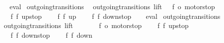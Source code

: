 \begin{isabellebody}
%
\isadelimproof
\ \ %
\endisadelimproof
%
\isatagproof
{}\isamarkupfalse%
\ eval%
\endisatagproof
{\isafoldproof}%
%
\isadelimproof
\isanewline
%
\endisadelimproof
\isanewline
{}\isamarkupfalse%
\ outgoing{\isacharunderscore}transitions{\isacharunderscore}{}{\isacharcolon}\isanewline
\ \ {\isachardoublequoteopen}outgoing{\isacharunderscore}transitions\ lift\ {}\ {\isacharequal}\ {\isacharbraceleft}{\isacharbar}{\isacharparenleft}{\isacharparenleft}f{}{\isacharcomma}\ o{}{\isacharparenright}{\isacharcomma}\ motorstop{}{\isacharparenright}{\isacharcomma}\isanewline
\ \ \ \ {\isacharparenleft}{\isacharparenleft}f{}{\isacharcomma}\ f{}{\isacharparenright}{\isacharcomma}\ up{}{}stop{\isacharparenright}{\isacharcomma}\isanewline
\ \ \ \ {\isacharparenleft}{\isacharparenleft}f{}{\isacharcomma}\ f{}{\isacharparenright}{\isacharcomma}\ up{}{}{\isacharparenright}{\isacharcomma}\isanewline
\ \ \ \ {\isacharparenleft}{\isacharparenleft}f{}{\isacharcomma}\ f{}{\isacharparenright}{\isacharcomma}\ down{}{}stop{\isacharparenright}{\isacharbar}{\isacharbraceright}{\isachardoublequoteclose}\isanewline
%
\isadelimproof
\ \ %
\endisadelimproof
%
\isatagproof
{}\isamarkupfalse%
\ eval%
\endisatagproof
{\isafoldproof}%
%
\isadelimproof
\isanewline
%
\endisadelimproof
\isanewline
{}\isamarkupfalse%
\ outgoing{\isacharunderscore}transitions{\isacharunderscore}{}{\isacharcolon}\isanewline
\ \ {\isachardoublequoteopen}outgoing{\isacharunderscore}transitions\ lift\ {}\ {\isacharequal}\ {\isacharbraceleft}{\isacharbar}\isanewline
\ \ \ \ {\isacharparenleft}{\isacharparenleft}f{}{\isacharcomma}\ o{}{\isacharparenright}{\isacharcomma}\ motorstop{}{\isacharparenright}{\isacharcomma}\isanewline
\ \ \ \ {\isacharparenleft}{\isacharparenleft}f{}{\isacharcomma}\ f{}{\isacharparenright}{\isacharcomma}\ up{}{}stop{\isacharparenright}{\isacharcomma}\isanewline
\ \ \ \ {\isacharparenleft}{\isacharparenleft}f{}{\isacharcomma}\ f{}{\isacharparenright}{\isacharcomma}\ down{}{}stop{\isacharparenright}{\isacharcomma}\isanewline
\ \ \ \ {\isacharparenleft}{\isacharparenleft}f{}{\isacharcomma}\ f{}{\isacharparenright}{\isacharcomma}\ down{}{}{\isacharparenright}\isanewline

\end{isabellebody}
